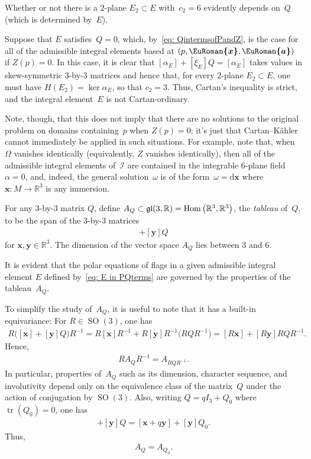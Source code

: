 \documentclass[11pt]{article}
\numberwithin{equation}{section}
\newcommand{\eurom}{\EuRoman}
\renewcommand{\d}{\mathrm{d}}%
\newcommand{\cI}{{\mathcal I}}
\newcommand{\bbR}{{\mathbb R}}
\newcommand{\SO}{\operatorname{SO}}
\newcommand{\eugl}{\operatorname{\frak{gl}}}
\newcommand{\mbx}{\mathbf{x}}
\newcommand{\mby}{\mathbf{y}}
\newcommand{\euroa}{\bm{\eurom{a}}}
\newcommand{\eurox}{\bm{\eurom{x}}}
\DeclareMathOperator{\tr}{tr}
\DeclareMathOperator{\Hom}{Hom}
\begin{document}
Whether or not there is a $2$-plane $E_2\subset E$ with~$c_2 = 6$
evidently depends on~$Q$ (which is determined by~$E$).

\begin{Example}\label{ex: noninvolutivity}
Suppose that $E$ satisfies~$Q = 0$, which, by~\eqref{eq: QintermsofPandZ},
is the case for all of the admissible integral elements based at $(p,\eurox,\euroa)$
if $Z(p) = 0$.
In this case, it is clear that $\left[\alpha_E\right]+\left[\xi_E\right]Q
= \left[\alpha_E\right]$ takes values in skew-symmetric $3$-by-$3$
matrices and hence that, for every $2$-plane $E_2\subset E$,
one must have $H(E_2) = \ker\alpha_E$, so that $c_2=3$.
Thus, Cartan's inequality is strict,
and the integral element~$E$ is not Cartan-ordinary.

Note, though, that this does not imply that there are no solutions
to the original problem on domains containing~$p$ when $Z(p)=0$;
it's just that Cartan--K\"ahler cannot immediately be applied
in such situations. For example, note that,
when~$\Omega$ vanishes identically (equivalently, $Z$ vanishes identically),
then all of the admissible integral elements of~$\cI$
are contained in the integrable $6$-plane field $\alpha = 0$,
and, indeed, the general solution~$\omega$ is of the form~$\omega=\d \mbx$
where $\mbx\colon M\to\bbR^3$ is any immersion.
\end{Example}

For any $3$-by-$3$ matrix $Q$, define $A_Q\subset \eugl(3,\bbR)
= \Hom \big(\bbR^3,\bbR^3\big)$, the \emph{tableau} of~$Q$,
to be the span of the $3$-by-$3$ matrices
\begin{gather*}
[\mbx ]+ [\mby] Q
\end{gather*}
for $\mbx,\mby\in\mathbb{R}^3$.
The dimension of the vector space $A_Q$ lies between $3$ and $6$.

It is evident that the polar equations of flags
in a given admissible integral element $E$
defined by~\eqref{eq: E in PQterms} are governed
by the properties of the tableau~$A_Q$.

To simplify the study of~$A_Q$, it is useful to note that
it has a built-in equivariance:
For $R\in\SO(3)$, one has
\begin{gather*}
R\bigl([\mbx ]+ [\mby] Q\bigr)R^{-1} = R[\mbx]R^{-1}+R[\mby]R^{-1}\big(RQR^{-1}\big) = [R\mbx] + [R\mby] RQR^{-1}.
\end{gather*}
Hence,
\begin{gather*}
R A_Q R^{-1} = A_{RQR^{-1}}.
\end{gather*}
In particular, properties of~$A_Q$ such as its dimension, character sequence, and involutivity depend only on the equivalence class of the matrix~$Q$ under the action of conjugation by $\SO(3)$. Also, writing $Q = q I_3 + Q_0$ where $\tr(Q_0) = 0$, one has
\begin{gather*}
[ \mbx ]+ [\mby ] Q = [ \mbx + q \mby ]+ [\mby ] Q_0 .
\end{gather*}
Thus,
\begin{gather*}
A_Q = A_{Q_0}.
\end{gather*}
\end{document}
